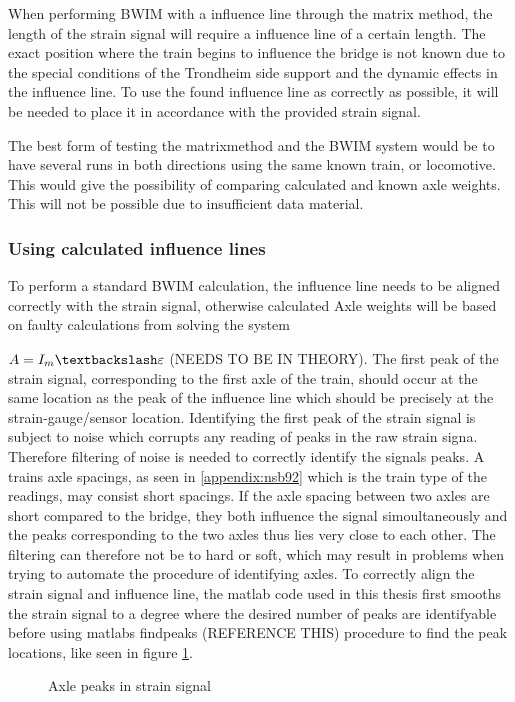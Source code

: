 When performing BWIM with a influence line through the matrix method, the length of the strain signal will require a influence line of a certain length. The exact position where the train begins to influence the bridge is not known due to the special conditions of the Trondheim side support and the dynamic effects in the influence line.
To use the found influence line as correctly as possible, it will be needed to place it in accordance with the provided strain signal.

The best form of testing the matrixmethod and the BWIM system would be to have several runs in both directions using the same known train, or locomotive. This would give the possibility of comparing calculated and known axle weights. This will not be possible due to insufficient data material.


\subsubsection{Using calculated influence lines}
To perform a standard BWIM calculation, the influence line needs to be aligned correctly with the strain signal, otherwise calculated Axle weights will be based on faulty calculations from solving the system

$A = I_m \textbackslash \varepsilon$
(NEEDS TO BE IN THEORY).
The first peak of the strain signal, corresponding to the first axle of the train, should occur at the same location as the peak of the influence line which should be precisely at the strain-gauge/sensor location.
Identifying the first peak of the strain signal is subject to noise which corrupts any reading of peaks in the raw strain signa. Therefore filtering of noise is needed to correctly identify the signals peaks. A trains axle spacings, as seen in \ref{appendix:nsb92} which is the train type of the readings, may consist short spacings. If the axle spacing between two axles are short compared to the bridge, they both influence the signal simoultaneously and the peaks corresponding to the two axles thus lies very close to each other. The filtering can therefore not be to hard or soft, which may result in problems when trying to automate the procedure of identifying axles.
To correctly align the strain signal and influence line, the matlab code used in this thesis first smooths the strain signal to a degree where the desired number of peaks are identifyable before using matlabs findpeaks (REFERENCE THIS) procedure to find the peak locations, like seen in figure \ref{fig:axle_peaks}.
\begin{figure}[htbp]
	\begin{adjustbox}{center}
		
	\end{adjustbox}
	\caption{Axle peaks in strain signal}
	\label{fig:axle_peaks}
\end{figure}


